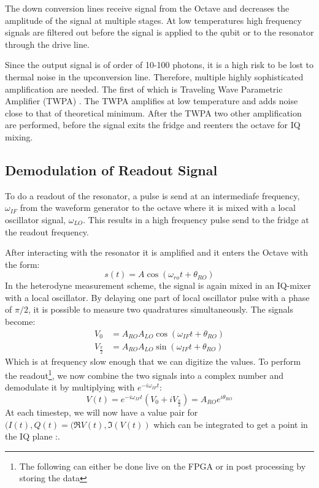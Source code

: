The down conversion lines receive signal from the Octave and decreases the amplitude of the signal at multiple stages. At low temperatures high frequency signals are filtered out before the signal is applied to the qubit or to the resonator through the drive line.

Since the output signal is of order of 10-100 photons, it is a high risk to be lost to thermal noise in the upconversion line. Therefore, multiple highly sophisticated amplification are needed. The first of which is Traveling Wave Parametric Amplifier (TWPA) \cite{mac}. The TWPA amplifies at low temperature and adds noise close to that of theoretical minimum. After the TWPA two other amplification are performed, before the signal exits the fridge and reenters the octave for IQ mixing. 


\subsection{Demodulation of Readout Signal}\label{sec:demodulation}
To do a readout of the resonator, a pulse is send at an intermediafe frequency, $\omega_{IF}$ from the waveform generator to the octave where it is mixed with a local oscillator signal, $\omega_{LO}$. This results in a high frequency pulse send to the fridge at the readout frequency.

After interacting with the resonator it is amplified and it enters the Octave with the form:
\begin{equation}
    s(t) = A \cos(\omega_{ro}t + \theta_{RO}) 
\end{equation}
In the heterodyne measurement scheme, the signal is again mixed in an IQ-mixer with a local oscillator. By delaying one part of local oscillator pulse with a phase of $\pi / 2$, it is possible to measure two quadratures simultaneously. The signals become:
\begin{align}
    V_0               &= A_{RO}A_{LO} \cos(\omega_{IF}t + \theta_{RO}) \\
    V_{\frac{\pi}{2}} &= A_{RO}A_{LO} \sin(\omega_{IF}t + \theta_{RO})
\end{align}
Which is at frequency slow enough that we can digitize the values. To perform the readout\footnote{The following can either be done live on the FPGA or in post processing by storing the data}, we now combine the two signals into a complex number and demodulate it by multiplying with $e^{-i\omega_{IF}t}$:
\begin{equation}
    V(t) = e^{-i\omega_{IF} t} (V_0 + i V_{\frac{\pi}{2}}) = A_{RO} e^{i\theta_{RO}}
\end{equation}
At each timestep, we will now have a value pair for $(I(t), Q(t) = (\Re{V(t), \Im(V(t))}$ which can be integrated to get a point in the IQ plane \cite{krantz_quantum_2019}:. 

